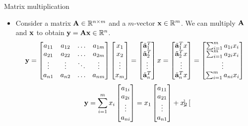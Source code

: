 \documentclass[aspectratio=169]{beamer}
\def\mf{\ensuremath\mathbf}
\begin{document}
\begin{frame}[t]{Matrix multiplication}
\begin{itemize}
\item Consider a matrix $\mf{A} \in \mathbb{R}^{n \times m}$ and a $m$-vector $\mf{x} \in \mathbb{R}^m$. We can multiply $\mf{A}$ and $\mf{x}$ to obtain $\mf{y} = \mf{A}\mf{x} \in \mathbb{R}^n$.
\[ \mf{y} = \begin{bmatrix}
a_{11} & a_{12} & \ldots & a_{1m} \\
a_{21} & a_{22} & \ldots & a_{2m} \\
\vdots & \vdots & \ddots & \vdots \\
a_{n1} & a_{n2} & \ldots & a_{nm} \\
\end{bmatrix}\begin{bmatrix}
x_1\\ x_2 \\ \vdots \\ x_{m}
\end{bmatrix} = \begin{bmatrix}
\tilde{\mf{a}}_1^T\\ \tilde{\mf{a}}_2^T \\ \vdots \\ \tilde{\mf{a}}_n^T
\end{bmatrix}x = \begin{bmatrix}
\tilde{\mf{a}}_{1}^Tx\\ \tilde{\mf{a}}_2^Tx \\ \vdots \\ \tilde{\mf{a}}_n^Tx
\end{bmatrix} = \begin{bmatrix}
\sum_{i=1}^ma_{1i}x_i\\ \sum_{i=1}^ma_{2i}x_i \\ \vdots \\ \sum_{i=1}^ma_{ni}x_i
\end{bmatrix} \]
\[ \mf{y} = \sum_{i=1}^mx_i\begin{bmatrix}
a_{1i} \\ a_{2i} \\ \vdots \\ a_{ni}
\end{bmatrix} = x_1\begin{bmatrix}
a_{11} \\ a_{21} \\ \vdots \\ a_{n1}
\end{bmatrix} + x_2 \begin{bmatrix}

\end{bmatrix}\]
\end{itemize}
\end{frame}
\end{document}
